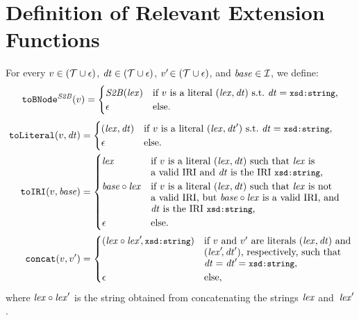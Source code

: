 \enlargethispage{\baselineskip}%
\vspace{-3mm}

\section{Definition of Relevant Extension Functions} \label{appdx:functions}

\vspace{-2mm}

For every $v \in (\mathcal{T} \cup \epsilon)$, $\mathit{dt} \in (\mathcal{T} \cup \epsilon)$, $v'\! \in (\mathcal{T} \cup \epsilon)$, 
and $\mathit{base} \in \mathcal{I}$, we define:
%
\begin{equation*}
	\fctToBNode{v} =
	\begin{cases}
		\LTB(\lex)
		& \text{if $v$ is a literal $\literalTuple$
s.t.\
%
$\dt = \ttl{xsd:string}$%
        ,}
        \\ 
		\error
		& \text{else.}
	\end{cases}
\end{equation*}
\begin{align*}
    \fctToLiteral{v, \dt} &= 
    \begin{cases}
        (\lex, \dt) &\text{if $v$ is a literal~$(\lex, \dt')$
s.t.\
%
$\dt = \ttl{xsd:string}$%
        }, \\
        \error & \text{else.}
    \end{cases}
\\
	\fctToIRI{v}{\baseIRI} &=
	\begin{cases}
		\mathit{lex}
		& \text{if $v$ is a literal $\literalTuple$ such that $\lex$ is}
		\\[-1mm]
		& \text{a valid IRI and $\dt$ is the IRI \ttl{xsd:string},}
		\\
		\baseIRI \circ \mathit{lex}
		& \text{if $v$ is a literal $\literalTuple$ such that $\lex$ is not}
		\\[-1mm]
		& \text{a valid IRI, but $\baseIRI \circ \mathit{lex}$ is a valid IRI, and}
		\\[-1mm]
		& \text{$\dt$ is the IRI \ttl{xsd:string},}
		\\
		\error
		& \text{else.}
	\end{cases}
\\
    \fctConcat{v}{v'} &= 
    \begin{cases}
        (\lex \circ \lex'\!, \ttl{xsd:string})  &\text{if $v$ and $v'$ are literals $(\lex,\dt)$ and}
		\\[-1mm]
        & \text{$(\lex'\!,\dt')$, respectively,
          such that}
		\\[-1mm]
        &
          \dt = \dt'\! = \ttl{xsd:string},
        \\ 
        \error &\text{else,}
		\\
    \end{cases}
\end{align*}
where $\mathit{lex} \circ \mathit{lex}'$ is the string obtained from concatenating the strings $\mathit{lex}$ and~$\mathit{lex}'\!$.


